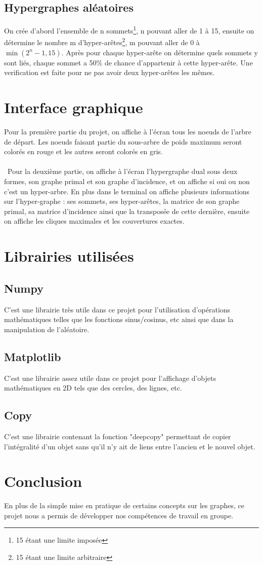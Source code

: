 \documentclass{article}
\begin{document}
	
	\subsection{Hypergraphes aléatoires}
	On crée d'abord l'ensemble de n sommets\footnote{15 étant une limite imposée}, n pouvant aller de 1 à 15, ensuite on détermine le nombre m d'hyper-arêtes\footnote{15 étant une limite arbitraire}, m pouvant aller de 0 à $\min(2^n-1,15)$. Après pour chaque hyper-arête on détermine quels sommets y sont liés, chaque sommet a 50\% de chance d'appartenir à cette hyper-arête. Une verification est faite pour ne pas avoir deux hyper-arêtes les mêmes.

\section{Interface graphique}
	Pour la première partie du projet, on affiche à l'écran tous les noeuds de l'arbre de départ. Les noeuds faisant partie du sous-arbre de poids maximum seront colorés en rouge et les autres seront colorés en gris.\\\ \\\ Pour la deuxième partie, on affiche à l'écran l'hypergraphe dual sous deux formes, son graphe primal et son graphe d'incidence, et on affiche si oui ou non c'est un hyper-arbre. En plus dans le terminal on affiche plusieurs informations sur l'hyper-graphe : ses sommets, ses hyper-arêtes, la matrice de son graphe primal, sa matrice d'incidence ainsi que la transposée de cette dernière, ensuite on affiche les cliques maximales et les couvertures exactes.

\section{Librairies utilisées}

	\subsection{Numpy}
		C'est une librairie très utile dans ce projet pour l'utilisation d'opérations mathématiques telles que les fonctions sinus/cosinus, etc ainsi que dans la manipulation de l'aléatoire.

	\subsection{Matplotlib}
		C'est une librairie assez utile dans ce projet pour l'affichage d'objets mathématiques en 2D tels que des cercles, des lignes, etc.
	
	\subsection{Copy}
		C'est une librairie contenant la fonction "deepcopy" permettant de copier l'intégralité d'un objet sans qu'il n'y ait de liens entre l'ancien et le nouvel objet.

\section{Conclusion}
	En plus de la simple mise en pratique de certains concepts sur les graphes, ce projet nous a permis de développer nos compétences de travail en groupe.
\end{document}
